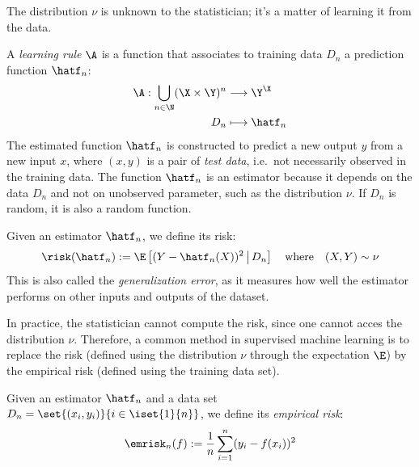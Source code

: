 \documentclass{../cs-classes/cs-classes}
\begin{document}
The distribution $\nu$ is unknown to the statistician; it's a matter of learning it from the data.

\begin{definition}
    A \emph{learning rule} $\A$ is a function that associates to training data $D_n$ a prediction function $\hatf_n$:
    \begin{equation*}
        \begin{aligned}
            \A: \bigcup_{n\in\N} (\X\times\Y)^n &\longrightarrow \Y^\X\\
            D_n &\longmapsto \hatf_n
        \end{aligned}
    \end{equation*}
    The estimated function $\hatf_n$ is constructed to predict a new output $y$ from a new input $x$, where $(x, y)$ is a pair of \emph{test data}, i.e.~not necessarily observed in the training data. The function $\hatf_n$ is an estimator because it depends on the data $D_n$ and not on unobserved parameter, such as the distribution $\nu$. If $D_n$ is random, it is also a random function.
\end{definition}

\begin{definition}
    Given an estimator $\hatf_n$, we define its risk:
    \begin{equation}
        \label{eq:sq-risk}
        \risk(\hatf_n) := \E\left[(Y-\hatf_n(X))^2\,\big| \, D_n\right] \quad \textnormal{where} \quad (X, Y)\sim\nu
    \end{equation}
    This is also called the \emph{generalization error}, as it measures how well the estimator performs on other inputs and outputs of the dataset.
\end{definition}

In practice, the statistician cannot compute the risk, since one cannot acces the distribution $\nu$. Therefore, a common method in supervised machine learning is to replace the risk (defined using the distribution $\nu$ through the expectation $\E$) by the empirical risk (defined using the training data set).

\begin{definition}
    \label{eq:sq-empirical-risk}
    Given an estimator $\hatf_n$ and a data set $D_n=\set{(x_i, y_i)}{i\in\iset{1}{n}}$, we define its \emph{empirical risk}:
    \begin{equation}
        \emrisk_n(f) := \frac{1}{n}\sum_{i=1}^n (y_i-f(x_i))^2
    \end{equation}
\end{definition}
\end{document}
